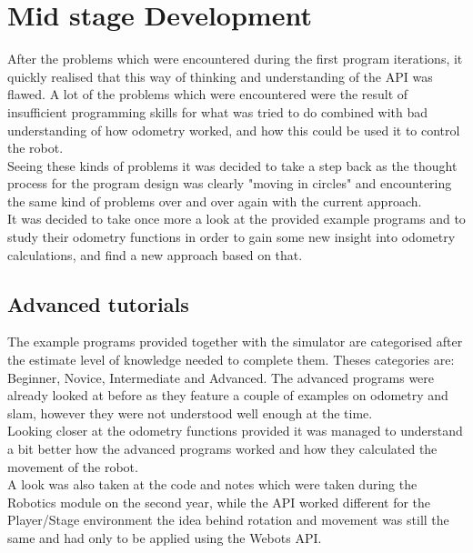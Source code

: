 \section{Mid stage Development}
After the problems which were encountered during the first program iterations, it quickly realised that this way of thinking and understanding of the API was flawed. A lot of the problems which were encountered were the result of insufficient programming skills for what  was tried to do combined with bad understanding of how odometry worked, and how this could be used it to control the robot.\\
Seeing these kinds of problems it was decided to take a step back as the thought process for the program design was clearly "moving in circles" and encountering the same kind of problems over and over again with the current approach. \\
It was decided to take once more a look at the provided example programs and to study their odometry functions in order to gain some new insight into odometry calculations, and find a new approach based on that.

\subsection{Advanced tutorials}
The example programs provided together with the simulator are categorised after the estimate level of knowledge needed to complete them. Theses categories are: Beginner, Novice, Intermediate and Advanced. The advanced programs were already looked at before as they feature a couple of examples on odometry and slam, however they were not understood  well enough at the time.\\
Looking closer at the odometry functions provided it was managed to understand a bit better how the advanced programs worked and how they calculated the movement of the robot. \\[3ex]

A look was also taken at the code and notes which were taken during the Robotics module on the second year, while the API worked different for the Player/Stage environment the idea behind rotation and movement was still the same and had only to be applied using the Webots API.

